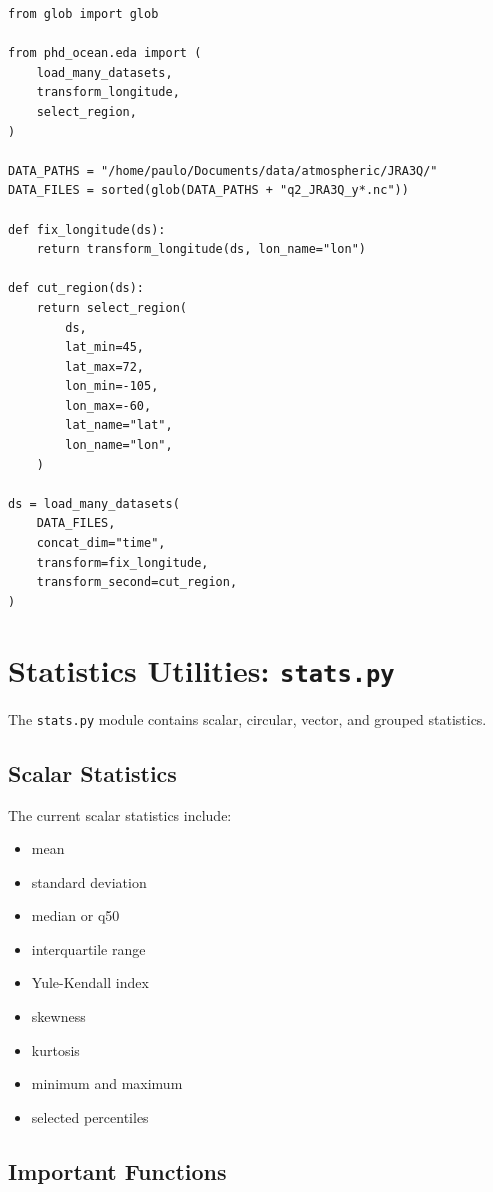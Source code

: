 \documentclass[11pt,a4paper]{article}
\begin{document}
\begin{lstlisting}[style=pythonstyle]
from glob import glob

from phd_ocean.eda import (
    load_many_datasets,
    transform_longitude,
    select_region,
)

DATA_PATHS = "/home/paulo/Documents/data/atmospheric/JRA3Q/"
DATA_FILES = sorted(glob(DATA_PATHS + "q2_JRA3Q_y*.nc"))

def fix_longitude(ds):
    return transform_longitude(ds, lon_name="lon")

def cut_region(ds):
    return select_region(
        ds,
        lat_min=45,
        lat_max=72,
        lon_min=-105,
        lon_max=-60,
        lat_name="lat",
        lon_name="lon",
    )

ds = load_many_datasets(
    DATA_FILES,
    concat_dim="time",
    transform=fix_longitude,
    transform_second=cut_region,
)
\end{lstlisting}

\section{Statistics Utilities: \texttt{stats.py}}

The \texttt{stats.py} module contains scalar, circular, vector, and grouped statistics.

\subsection{Scalar Statistics}

The current scalar statistics include:

\begin{itemize}
    \item mean
    \item standard deviation
    \item median or q50
    \item interquartile range
    \item Yule-Kendall index
    \item skewness
    \item kurtosis
    \item minimum and maximum
    \item selected percentiles
\end{itemize}

\subsection{Important Functions}
\end{document}
